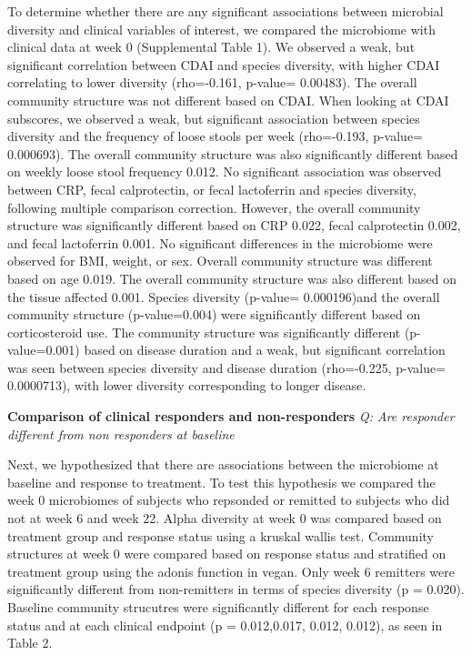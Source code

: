\documentclass[11pt,]{article}
\begin{document}
To determine whether there are any significant associations between
microbial diversity and clinical variables of interest, we compared the
microbiome with clinical data at week 0 (Supplemental Table 1). We
observed a weak, but significant correlation between CDAI and species
diversity, with higher CDAI correlating to lower diversity (rho=-0.161,
p-value= 0.00483). The overall community structure was not different
based on CDAI. When looking at CDAI subscores, we observed a weak, but
significant association between species diversity and the frequency of
loose stools per week (rho=-0.193, p-value= 0.000693). The overall
community structure was also significantly different based on weekly
loose stool frequency 0.012. No significant association was observed
between CRP, fecal calprotectin, or fecal lactoferrin and species
diversity, following multiple comparison correction. However, the
overall community structure was significantly different based on CRP
0.022, fecal calprotectin 0.002, and fecal lactoferrin 0.001. No
significant differences in the microbiome were observed for BMI, weight,
or sex. Overall community structure was different based on age 0.019.
The overall community structure was also different based on the tissue
affected 0.001. Species diversity (p-value= 0.000196)and the overall
community structure (p-value=0.004) were significantly different based
on corticosteroid use. The community structure was significantly
different (p-value=0.001) based on disease duration and a weak, but
significant correlation was seen between species diversity and disease
duration (rho=-0.225, p-value= 0.0000713), with lower diversity
corresponding to longer disease.

\textbf{Comparison of clinical responders and non-responders} \emph{Q:
Are responder different from non responders at baseline}

Next, we hypothesized that there are associations between the microbiome
at baseline and response to treatment. To test this hypothesis we
compared the week 0 microbiomes of subjects who repsonded or remitted to
subjects who did not at week 6 and week 22. Alpha diversity at week 0
was compared based on treatment group and response status using a
kruskal wallis test. Community structures at week 0 were compared based
on response status and stratified on treatment group using the adonis
function in vegan. Only week 6 remitters were significantly different
from non-remitters in terms of species diversity (p = 0.020). Baseline
community strucutres were significantly different for each response
status and at each clinical endpoint (p = 0.012,0.017, 0.012, 0.012), as
seen in Table 2.
\end{document}
